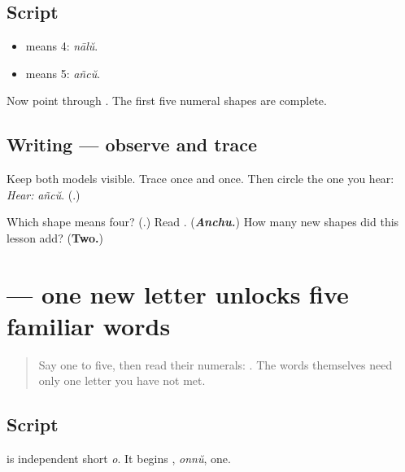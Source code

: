 \subsection*{Script}
\begin{itemize}
\raggedright
  \item \textbf{} means 4: \emph{nālŭ}.
  \item \textbf{} means 5: \emph{añcŭ}.
\end{itemize}

Now point through \textbf{    }. The first five numeral shapes are complete.

\subsection*{Writing — observe and trace}

Keep both models visible. Trace \textbf{} once and \textbf{} once. Then circle the one you hear: \emph{Hear:} \emph{añcŭ}. (\textbf{}.)

\begin{tcolorbox}[breakable,colback=teal!4,colframe=teal!35!black,title={Before you move on}]
Which shape means four? (\textbf{}.) Read \textbf{}. (\emph{\textbf{Anchu.}}) How many new shapes did this lesson add? (\textbf{Two.})
\end{tcolorbox}
\section[\texorpdfstring{\ml{ഒ} (independent o)}{ഒ (independent o)}]{ — one new letter unlocks five familiar words}

\label{lesson:ML-W07-number-words-1-5}



\begin{quote}
Say one to five, then read their numerals: \textbf{    }. The words themselves need only one letter you have not met.
\end{quote}

\subsection*{Script}
\textbf{} is independent short \emph{o}. It begins \textbf{}, \emph{onnŭ}, one.

